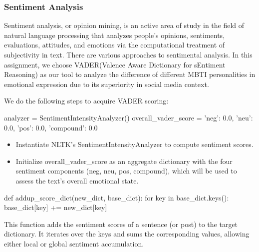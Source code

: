 \documentclass[12pt]{article}
\begin{document}
	
	
	
	\subsubsection{Sentiment Analysis}
	Sentiment analysis, or opinion mining, is an active area of study in the field of natural language processing that analyzes people's opinions, sentiments, evaluations, attitudes, and emotions via the computational treatment of subjectivity in text. There are various approaches to sentimental analysis. In this assignment, we choose VADER(Valence Aware Dictionary for sEntiment Reasoning) as our tool to analyze the difference of different MBTI personalities in emotional expression due to its superiority in social media context\cite{VADER}.
	
	
	We do the following steps to acquire VADER scoring:

	 \begin{python}
analyzer = SentimentIntensityAnalyzer()
overall_vader_score = {'neg': 0.0, 'neu': 0.0, 'pos': 0.0, 'compound': 0.0}
	\end{python}
	\begin{itemize}
	\item Instantiate NLTK’s SentimentIntensityAnalyzer to compute sentiment scores.
	\item Initialize overall\_vader\_score as an aggregate dictionary with the four sentiment components (neg, neu, pos, compound), which will be used to assess the text’s overall emotional state.

	\end{itemize}

	\begin{python}
def addup_score_dict(new_dict, base_dict):
    for key in base_dict.keys():
        base_dict[key] += new_dict[key]
	\end{python}
	This function adds the sentiment scores of a sentence (or post) to the target dictionary. It iterates over the keys and sums the corresponding values, allowing either local or global sentiment accumulation.
\end{document}
